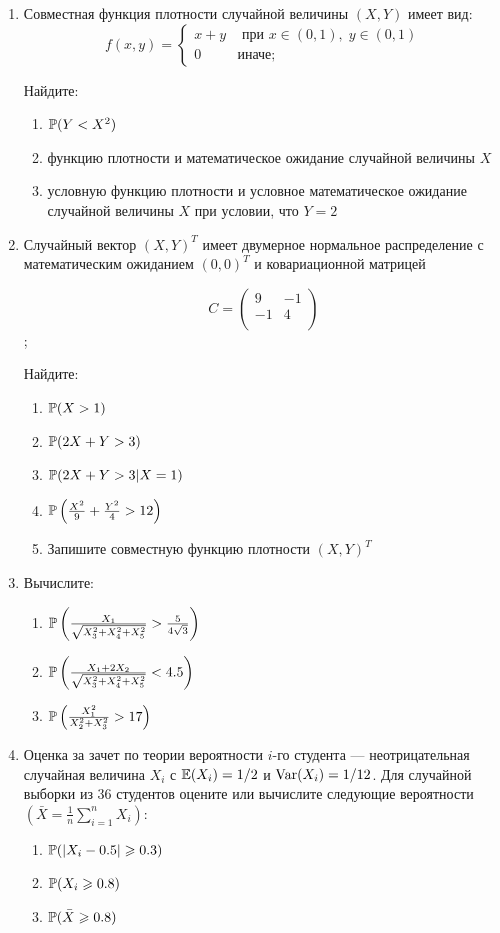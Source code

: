 \begin{enumerate}
\item  Совместная функция плотности случайной величины $(X,Y)$ имеет вид:
\begin{equation*}
f(x,y) =
 \begin{cases}
   x+y &\text{ при }x \in (0,1),\;y \in (0,1) \\
   0 &\text{иначе};
 \end{cases}
\end{equation*}

Найдите:
\begin{enumerate}
\item $\P(Y<X^2)$
\item функцию плотности и математическое ожидание случайной величины $X$
\item условную функцию плотности и условное математическое ожидание случайной
величины $X$ при условии, что $Y=2$
\end{enumerate}

\item Случайный вектор $(X,Y)^T$ имеет двумерное нормальное распределение
с математическим ожиданием $(0,0)^T$ и ковариационной матрицей

\[
C = \begin{pmatrix}
9 & -1 \\
-1 & 4 \\
\end{pmatrix}
\];

Найдите:
\begin{enumerate}
\item $\P(X>1)$
\item $\P(2X+Y>3)$
\item $\P(2X+Y>3|X=1)$
\item $\P\left(\frac{X^2}{9}+\frac{Y^2}{4} >12\right)$
\item Запишите совместную функцию плотности  $(X,Y)^T$
\end{enumerate}

\item Вычислите:
\begin{enumerate}
\item $\P\left(\frac{X_1}{\sqrt{X_3^2+X_4^2+X_5^2}}>\frac{5}{4\sqrt{3}}\right)$
\item $\P\left(\frac{X_1+2X_2}{\sqrt{X_3^2+X_4^2+X_5^2}}<4.5\right)$
\item $\P\left(\frac{X_1^2}{X_2^2+X_3^2}>17\right)$
\end{enumerate}

\item Оценка за зачет по теории вероятности $i$-го студента — неотрицательная
случайная величина $X_i$ с $\E(X_i)=1/2$ и $\Var(X_i)=1/12$.
Для случайной выборки из $36$ студентов оцените или вычислите следующие вероятности
$\left(\bar{X} = \frac{1}{n} \sum \limits_{i=1}^n X_i \right)$:
\begin{enumerate}
\item $\P(|X_i-0.5|\geqslant 0.3)$
\item $\P(X_i\geqslant 0.8)$
\item $\P(\bar{X}\geqslant 0.8)$


\end{enumerate}
\end{enumerate}
